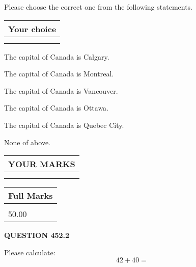 \documentclass[12pt]{article}
\begin{document}
  
Please choose the correct one from the following statements.
  
  
\noindent\hspace{3.0in} \begin{tabular}{|l|}
\hline
Your choice \\
\hline
 \\ 
 \\ 
\hline
\end{tabular}
  
  
 
 
The capital of Canada is Calgary.
 
 
The capital of Canada is Montreal.
 
 
The capital of Canada is Vancouver.
 
 
The capital of Canada is Ottawa.
 
 
The capital of Canada is Quebec City.
 
 
 None of above.
 
 
  
\vspace{0.2in}
  
\noindent\begin{tabular}{|l|}
\hline
 YOUR MARKS  \\
\hline
 \\ 
 \\ 
\hline
\end{tabular}
\hspace{0.05in} \begin{tabular}{|l|}
\hline
 Full Marks  \\
\hline
 \\ 
50.00 \\
\hline
\end{tabular}
{\textbf{\Large{QUESTION
452.2 
}}}
  
  
 
Please calculate:
\begin{equation}
42 +  %
40 = \nonumber
\end{equation}
 

 

 
   
   
 \vspace{0.2in}
 
   
   
   
   
\end{document}
